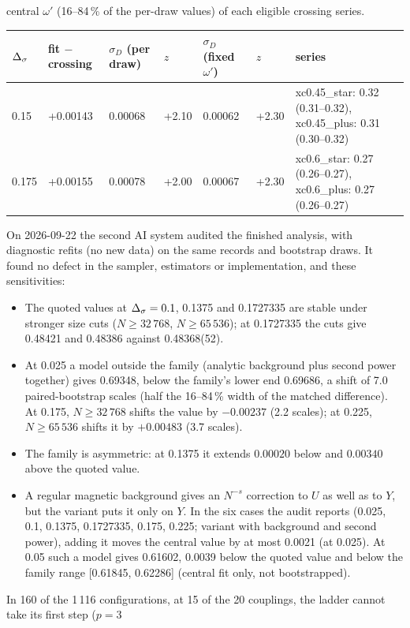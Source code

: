 \begin{description}[leftmargin=1.2em]
\begin{table}[htbp]
{central $\omega'$ (16--84\,\% of the per-draw values) of each eligible crossing series.}\label{mc:tab:oned}
\begin{tabular}{@{}llllll>{\raggedright\arraybackslash}p{5.0cm}@{}}\toprule
$\Delta_\sigma$ & fit $-$ crossing & $\sigma_D$ (per draw) & $z$ & $\sigma_D$ (fixed $\omega'$) & $z$ & series \\\midrule
0.15 & +0.00143 & 0.00068 & +2.10 & 0.00062 & +2.30 & xc0.45\_star: 0.32 (0.31--0.32), xc0.45\_plus: 0.31 (0.30--0.32) \\
0.175 & +0.00155 & 0.00078 & +2.00 & 0.00067 & +2.30 & xc0.6\_star: 0.27 (0.26--0.27), xc0.6\_plus: 0.27 (0.26--0.27) \\
\bottomrule\end{tabular}
\end{table}
\item[Audit.] On 2026-09-22 the second AI system audited the finished analysis, with diagnostic refits
 (no new data) on the same records and bootstrap draws. It found no defect in the sampler, estimators or implementation, and these
 sensitivities:
 \begin{itemize}
 \item The quoted values at $\Delta_\sigma=0.1$, 0.1375 and 0.1727335 are stable under stronger size cuts ($N\ge32\,768$, $N\ge65\,536$); at
  0.1727335 the cuts give 0.48421 and 0.48386 against 0.48368(52).
 \item At 0.025 a model outside the family (analytic background plus second power together) gives 0.69348, below the family's lower end
  0.69686, a shift of 7.0 paired-bootstrap scales (half the 16--84\,\% width of the matched difference). At 0.175, $N\ge32\,768$ shifts the
  value by $-0.00237$ (2.2 scales); at 0.225, $N\ge65\,536$ shifts it by $+0.00483$ (3.7 scales).
 \item The family is asymmetric: at 0.1375 it extends $0.00020$ below and $0.00340$ above the quoted value.
 \item A regular magnetic background gives an $N^{-s}$ correction to $U$ as well as to $Y$, but the  variant puts it only on
  $Y$. In the six cases the audit reports (0.025, 0.1, 0.1375, 0.1727335, 0.175, 0.225; variant with background and second power),
  adding it moves the central value by at most 0.0021 (at 0.025). At 0.05 such a model gives 0.61602, 0.0039 below the quoted value and below
  the family range [0.61845, 0.62286] (central fit only, not bootstrapped).
 \end{itemize}
\item[The degree ladder.] In 160 of the 1\,116 configurations, at 15 of the 20 couplings, the ladder cannot take its first step ($p=3$

\end{description}
